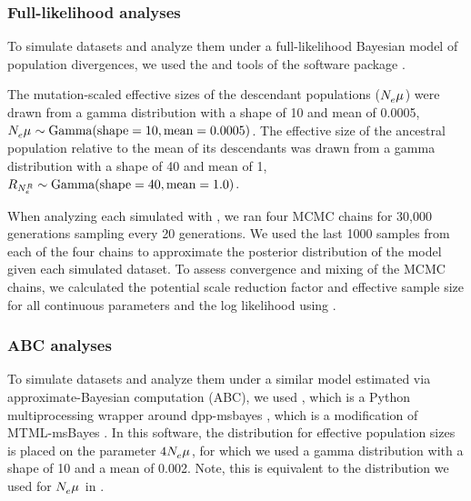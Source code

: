 \documentclass[letterpaper,12pt]{article}
\begin{document}
\subsubsection{Full-likelihood analyses}

To simulate datasets and analyze them under a full-likelihood Bayesian model of
population divergences, we used the \simcoevolity and \ecoevolity tools of the
\ecoevolity software package
\citep[Version 0.3.2, Commit c128046;][]{Oaks2018ecoevolity,Oaks2018paic}.

The mutation-scaled effective sizes of the descendant populations
($N_{e}^{}\mu_{}$) were drawn from a gamma distribution with a shape of 10
and mean of 0.0005,
$N_{e}^{}{}\mu_{}{} \sim \textrm{Gamma}(\textrm{shape} = 10, \textrm{mean} = 0.0005)$.
The effective size of the ancestral population relative to the mean of
its descendants was drawn from a gamma distribution with a shape of 40 and mean of 1,
$R_{N_{e}^{R{}}} \sim \textrm{Gamma}(\textrm{shape} = 40, \textrm{mean} = 1.0)$.

When analyzing each simulated \dataset with \ecoevolity, we ran four MCMC
chains for 30,000 generations sampling every 20 generations.
We used the last 1000 samples from each of the four chains to approximate the
posterior distribution of the model given each simulated dataset.
To assess convergence and mixing of the MCMC chains, we calculated the
potential scale reduction factor \citep[PSRF; the square root of Equation 1.1
in][]{Brooks1998} and effective sample size \citep[ESS;][]{Gong2014} for all
continuous parameters and the log likelihood using
\pycoevolity
\citep[Version 0.2.11 Commit 85ea44b;][]{Oaks2018ecoevolity,PycoevolityRepoOnline}.

\subsubsection{ABC analyses}

To simulate datasets and analyze them under a similar model estimated via
approximate-Bayesian computation (ABC),
we used \pymsbayes
\citep[Version 0.3.7, Commit 54f720df;][]{Oaks2014dpp},
which is a Python multiprocessing wrapper around dpp-msbayes
\citep{Oaks2014dpp}, which is a modification of
MTML-msBayes \citep{Huang2011}.
In this software, the distribution for effective population sizes is placed
on the parameter $4N_{e}^{}{}\mu_{}{}$, for which we used
a gamma distribution with a shape of 10 and a mean of 0.002.
Note, this is equivalent to the distribution we used for $N_{e}^{}{}\mu_{}{}$
in \ecoevolity.
\end{document}

